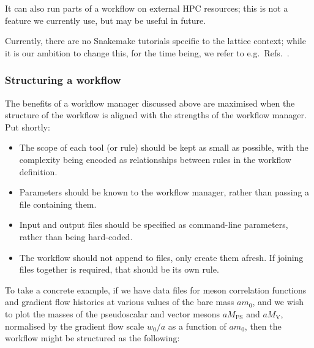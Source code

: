 \documentclass{article}
\begin{document}
It can also run parts of a workflow on external HPC resources;
this is not a feature we currently use,
but may be useful in future.

Currently,
there are no Snakemake tutorials specific to the lattice context;
while it is our ambition to change this,
for the time being,
we refer to e.g.\ Refs.~\cite{carpentries-snakemake,snakemake-tutorial}.

\subsubsection{Structuring a workflow}

The benefits of a workflow manager discussed above are maximised when
the structure of the workflow is aligned with the strengths of the workflow manager.
Put shortly:
\begin{itemize}
  \item
        The scope of each tool
        (or rule)
        should be kept as small as possible,
        with the complexity being encoded as relationships between rules in the workflow definition.
  \item
        Parameters should be known to the workflow manager,
        rather than passing a file containing them.
  \item
        Input and output files should be specified as command-line parameters,
        rather than being hard-coded.
  \item
        The workflow should not append to files,
        only create them afresh.
        If joining files together is required,
        that should be its own rule.
\end{itemize}

To take a concrete example,
if we have data files for meson correlation functions and gradient flow histories
at various values of the bare mass $am_{0}$,
and we wish to plot the masses of the pseudoscalar and vector mesons
$aM_{\mathrm{PS}}$ and $aM_{\mathrm{V}}$,
normalised by the gradient flow scale $w_{0}/a$
as a function of $am_{0}$,
then the workflow might be structured as the following:
\end{document}
